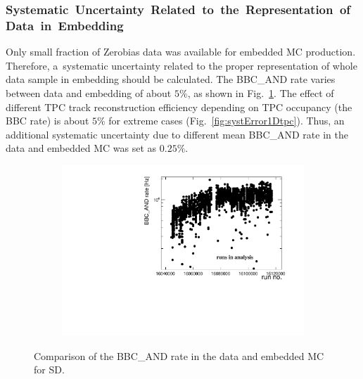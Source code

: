 \subsubsection{\mbox{Systematic Uncertainty Related to the Representation of  Data in Embedding}}

Only small fraction of Zerobias data was available for embedded MC production. Therefore, a~systematic uncertainty related to the proper representation of whole data sample in embedding should be calculated. The BBC\_AND rate varies between data and embedding of about $5\%$, as shown in Fig.~\ref{fig:embSyst}. The effect of different TPC track reconstruction efficiency depending on TPC occupancy (the BBC rate) is about $5\%$ for extreme cases (Fig.~\ref{fig:systError1Dtpc}). Thus, an additional systematic uncertainty due to different mean BBC\_AND rate in the data and embedded MC was set as $0.25\%$.


\begin{figure}[h!]
	\centering
	\begin{subfigure}{.49\textwidth}
		\includegraphics[width=\textwidth,page=10]{chapters/chrgSTAR/img/tpcEffi/Out.pdf}
	\end{subfigure}
	\begin{minipage}{.49\textwidth}
		\caption{Comparison of the BBC\_AND rate in the data and embedded MC for SD.}
		\label{fig:embSyst}
	\end{minipage}
	
\end{figure}

